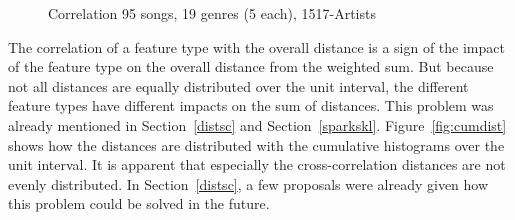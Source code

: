 \begin{figure}[htbp]
	\centering
	\caption{Correlation 95 songs, 19 genres (5 each), 1517-Artists}
	\label{fig:corr2}
\end{figure}\FloatBarrier

\noindent The correlation of a feature type with the overall distance is a sign of the impact of the feature type on the overall distance from the weighted sum. But because not all distances are equally distributed over the unit interval, the different feature types have different impacts on the sum of distances. This problem was already mentioned in Section~\ref{distsc} and Section~\ref{sparkskl}. Figure~\ref{fig:cumdist} shows how the distances are distributed with the cumulative histograms over the unit interval. It is apparent that especially the cross-correlation distances are not evenly distributed. In Section~\ref{distsc}, a few proposals were already given how this problem could be solved in the future. 

